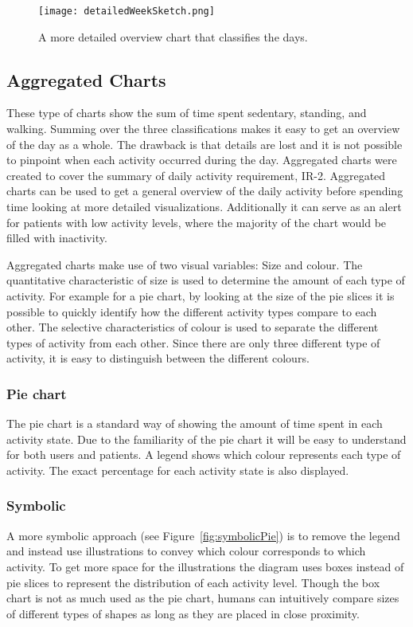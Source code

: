\begin{figure}[h!]
	\centering
		\texttt{[image: detailedWeekSketch.png]}
		\caption[U2 sketch]{A more detailed overview chart that classifies the days.}
		\label{fig:detailedWeek}
\end{figure}

\subsection{Aggregated Charts}
These type of charts show the sum of time spent sedentary, standing, and walking. Summing over the three classifications makes it easy to get an overview of the day as a whole. The drawback is that details are lost and it is not possible to pinpoint when each activity occurred during the day. Aggregated charts were created to cover the summary of daily activity requirement, IR-2. Aggregated charts can be used to get a general overview of the daily activity before spending time looking at more detailed visualizations. Additionally it can serve as an alert for patients with low activity levels, where the majority of the chart would be filled with inactivity.

Aggregated charts make use of two visual variables: Size and colour. The quantitative characteristic of size is used to determine the amount of each type of activity. For example for a pie chart, by looking at the size of the pie slices it is possible to quickly identify how the different activity types compare to each other. The selective characteristics of colour is used to separate the different types of activity from each other. Since there are only three different type of activity, it is easy to distinguish between the different colours. 

\subsubsection{Pie chart}
The pie chart is a standard way of showing the amount of time spent in each activity state. Due to the familiarity of the pie chart it will be easy to understand for both users and patients. A legend shows which colour represents each type of activity. The exact percentage for each activity state is also displayed.

\subsubsection{Symbolic}
A more symbolic approach (see Figure~\ref{fig:symbolicPie}) is to remove the legend and instead use illustrations to convey which colour corresponds to which activity. To get more space for the illustrations the diagram uses boxes instead of pie slices to represent the distribution of each activity level. Though the box chart is not as much used as the pie chart, humans can intuitively compare sizes of different types of shapes as long as they are placed in close proximity. 

